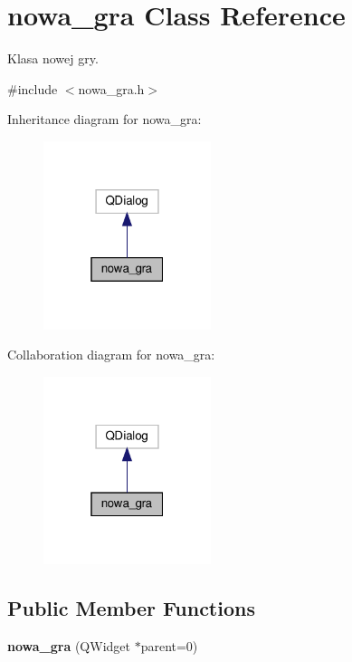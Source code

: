 \hypertarget{classnowa__gra}{}\section{nowa\+\_\+gra Class Reference}
\label{classnowa__gra}


Klasa nowej gry.  




{\ttfamily \#include $<$nowa\+\_\+gra.\+h$>$}



Inheritance diagram for nowa\+\_\+gra\+:\nopagebreak
\begin{figure}[H]
\begin{center}
\leavevmode
\includegraphics[width=139pt]{classnowa__gra__inherit__graph}
\end{center}
\end{figure}


Collaboration diagram for nowa\+\_\+gra\+:\nopagebreak
\begin{figure}[H]
\begin{center}
\leavevmode
\includegraphics[width=139pt]{classnowa__gra__coll__graph}
\end{center}
\end{figure}
\subsection*{Public Member Functions}
\begin{DoxyCompactItemize}
\item 
\mbox{\label{classnowa__gra_a154dd9cfc2c4f5e8657c048455d3fb32}} 
{\bfseries nowa\+\_\+gra} (Q\+Widget $\ast$parent=0)
\end{DoxyCompactItemize}



